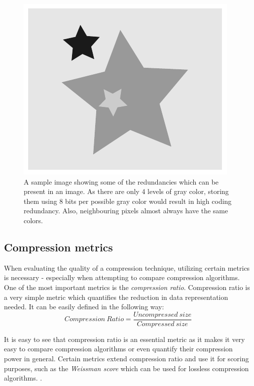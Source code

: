 \documentclass[thesis=M,english]{FITthesis}[2012/10/20]
\begin{document}
\begin{figure}[h]
  \centering
  \includegraphics{imgs/redundancies}
  \caption{A sample image showing some of the redundancies which can be present in an image.
  		  As there are only 4 levels of gray color, storing them using 8 bits
  		  per possible gray color would result in high coding redundancy. Also,
  		  neighbouring pixels almost always have the same colors.}
  \label{fig:redundancies}
\end{figure}

\subsection{Compression metrics}
\label{metrics}
When evaluating the quality of a compression technique, utilizing certain
metrics is necessary - especially when attempting to compare compression
algorithms.
\\

One of the most important metrics is the \emph{compression ratio}.
Compression ratio is a very simple metric which quantifies the reduction
in data representation needed. It can be easily defined in the following
way:
\begin{equation}
Compression\ Ratio = \frac{Uncompressed\ size}{Compressed\ size}    
\end{equation}

It is easy to see that compression ratio is an essential metric as
it makes it very easy to compare compression algorithms or even
quantify their compression power in general. Certain metrics
extend compression ratio and use it for scoring purposes, such as
the \emph{Weissman score} which can be used for lossless compression
algorithms. \cite{CITATIONNEEDED}.
\\
\end{document}
